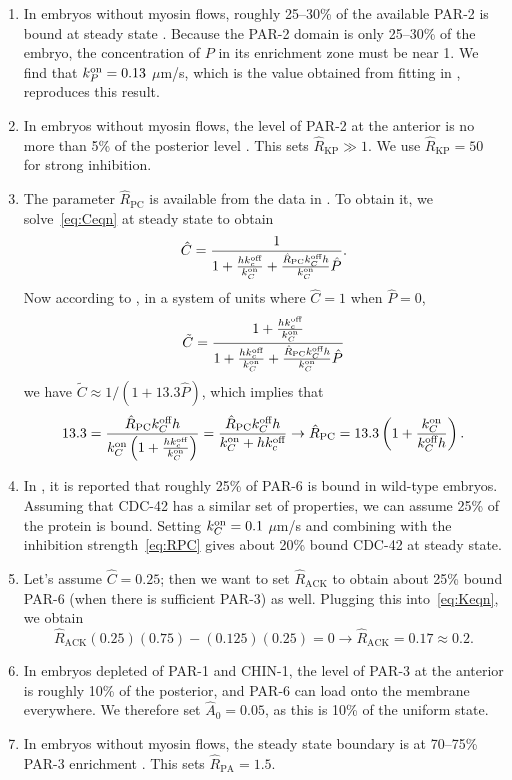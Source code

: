 \documentclass[11pt]{article}
\newcommand{\6}[1]{#1_{\text{6}}}
\newcommand{\3}[1]{#1_{\text{3}}}
\begin{document}
\begin{enumerate}
\item In embryos without myosin flows, roughly 25--30\% of the available PAR-2 is bound at steady state \cite[Fig.~S3]{gross2019guiding}. Because the PAR-2 domain is only 25--30\% of the embryo, the concentration of $P$ in its enrichment zone must be near 1. We find that $k^\text{on}_P=0.13$ $\mu$m/s, which is the value obtained from fitting in \cite{gross2019guiding}, reproduces this result.
\item In embryos without myosin flows, the level of PAR-2 at the anterior is no more than 5\% of the posterior level \cite[Fig.~2c]{gross2019guiding}. This sets $\hat R_\text{KP} \gg 1$. We use $\hat R_\text{KP}=50$ for strong inhibition. 
\item The parameter $\hat{R}_\text{PC}$ is available from the data in \cite{sailer2015dynamic}. To obtain it, we solve\ \eqref{eq:Ceqn} at steady state to obtain
\begin{equation}
\hat C = \frac{1}{1+\frac{h k^\text{off}_c}{k^\text{on}_C}+\frac{\hat R_\text{PC}k^\text{off}_C h}{k^\text{on}_C} \hat P}. 
\end{equation}
Now according to \cite{sailer2015dynamic}, in a system of units where $\hat C=1$ when $\hat P=0$,
\begin{equation*}
\tilde C =   \frac{1+\frac{h k^\text{off}_c}{k^\text{on}_C}}{1+\frac{h k^\text{off}_c}{k^\text{on}_C}+\frac{\hat R_\text{PC}k^\text{off}_C h}{k^\text{on}_C} \hat P}
\end{equation*} 
we have $\tilde{C} \approx 1/(1+13.3\hat{P})$, which implies that 
\begin{equation}
\label{eq:RPC}
13.3 = \frac{\hat R_\text{PC}k^\text{off}_C h}{k^\text{on}_C\left(1+\frac{h k^\text{off}_c}{k^\text{on}_C}\right)}= \frac{\hat R_\text{PC}k^\text{off}_C h}{k^\text{on}_C+h k^\text{off}_c} \rightarrow \hat R_\text{PC}=13.3\left(1+\frac{k^\text{on}_C}{k^\text{off}_C h}\right).
\end{equation}
\item In \cite[Fig.~S3i]{gross2019guiding}, it is reported that roughly 25\% of PAR-6 is bound in wild-type embryos. Assuming that CDC-42 has a similar set of properties, we can assume 25\% of the protein is bound. Setting $k^\text{on}_C=0.1$ $\mu$m/s and combining with the inhibition strength\ \eqref{eq:RPC} gives about 20\% bound CDC-42 at steady state.
\item Let's assume $\hat C = 0.25$; then we want to set $\hat{R}_\text{ACK}$ to obtain about 25\% bound PAR-6 (when there is sufficient PAR-3) as well. Plugging this into\ \eqref{eq:Keqn}, we obtain
\begin{equation*}
\hat{R}_\text{ACK}(0.25)(0.75)- (0.125)(0.25)=0 \rightarrow \hat{R}_\text{ACK}=0.17\approx 0.2.
\end{equation*}
\item In embryos depleted of PAR-1 and CHIN-1, the level of PAR-3 at the anterior is roughly 10\% of the posterior, and PAR-6 can load onto the membrane everywhere. We therefore set $\hat A_0=0.05$, as this is 10\% of the uniform state.
\item In embryos without myosin flows, the steady state boundary is at 70--75\% PAR-3 enrichment \cite[Fig.~5B]{zonies2010symmetry}. This sets $\hat{R}_\text{PA}=1.5$.
\end{enumerate}
\end{document}
